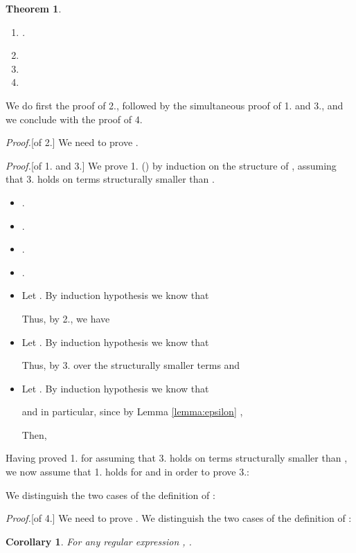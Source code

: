 \documentclass[preprint]{sigplanconf}
\newcounter{item}
\newtheorem{theorem}[item]{Theorem}
\newtheorem{corollary}[item]{Corollary}
\newenvironment{proof}{\begin{trivlist}\item[]{\em Proof.}}{\end{trivlist}}
\begin{document}
\begin{theorem}
\label{theo:broadcast}~
\begin{enumerate}
\item .
\item 
\item 
\item 
\end{enumerate}
\end{theorem}
We do first the proof of 2., followed by the simultaneous proof of 1. and 3.,
and we conclude with the proof of 4.
\begin{proof}[of 2.]
We need to prove .

\end{proof}
\begin{proof}[of 1. and 3.]
We prove 1. () by induction on the structure
of , assuming that 3. holds on terms structurally smaller than .
\begin{itemize}
\item .
\item .
\item .
\item .
\item Let . By induction hypothesis we know that 

Thus, by 2., we have

\item Let . By induction hypothesis we know that 

Thus, by 3. over the structurally smaller terms  and 

\item Let . By induction hypothesis we know that 

and in particular, since by Lemma \ref{lemma:epsilon} , 

Then,

\end{itemize}

\noindent
Having proved 1. for  assuming that 3. holds on terms structurally smaller
than , we now assume that 1. holds for  and  in order to
prove 3.:


We distinguish the two cases of the definition of :


\end{proof}
\begin{proof}[of 4.]
We need to prove
.
We distinguish the two cases of the definition of :

\end{proof}

\begin{corollary}
\label{corollary:Lpbullet}
For any regular expression , .
\end{corollary}
\end{document}
